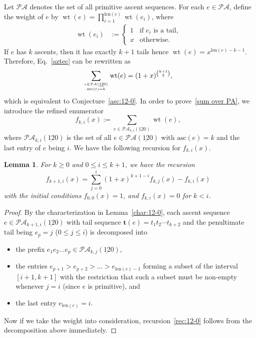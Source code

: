 \documentclass[12pt,A4]{amsart}
\numberwithin{equation}{section}
\theoremstyle{plain}
\newtheorem{lemma}[theorem]{Lemma}
\theoremstyle{definition}
\def\PA{\mathcal{PA}}
\def\len{\mathrm{len}}
\def\asc{\mathrm{asc}}
\def\wt{\operatorname{wt}}
\def\I{\operatorname{{\bf I}}}
\def\tt{\mathbf{t}}
\begin{document}
Let $\PA$ denotes the set of all primitive ascent sequences. For each $e\in\PA$, define the weight of $e$ by $\wt(e) =\prod\limits_{i=1}^{\len(e)}\wt(e_i)$, where 
\begin{align*}
\wt(e_i)&:=\begin{cases}
1 & \text{if $e_i$ is a tail,}\\
x & \text{otherwise.}
\end{cases}
\end{align*}
If $e$ has $k$ ascents, then it has exactly $k+1$ tails hence $\wt(e)=x^{\len(e)-k-1}$.
Therefore, Eq.~\eqref{aztec} can be rewritten as
\begin{equation}\label{sum over PA}
 \sum_{{e\in\PA(\underline{12}0)}\atop{\asc(e)=k}}\wt(e)=(1+x)^{{k+1\choose 2}},
\end{equation}
which is equivalent to Conjecture~\ref{asc:12-0}.
In order to prove~\eqref{sum over PA}, we introduce the refined enumerator 
$$
f_{k,i}(x):=\sum_{e\in\PA_{k,i}(\underline{12}0)}\wt(e), 
$$
where $\PA_{k,i}(\underline{12}0)$ is the set of all $e\in\PA(\underline{12}0)$ with $\asc(e)=k$ and the last entry of $e$ being $i$. We have the following recursion for $f_{k,i}(x)$.
\begin{lemma}For $k\geq0$ and $0\leq i\leq k+1$, we have the recursion
\begin{equation}\label{rec:12-0}
f_{k+1,i}(x)=\sum_{j=0}^{i}(1+x)^{k+1-i}f_{k,j}(x)-f_{k,i}(x)
\end{equation}
with the initial conditions $f_{0,0}(x)=1$, and $f_{k,i}(x)=0$ for $k<i$.
\end{lemma}

\begin{proof}
By the characterization in Lemma~\ref{char:12-0}, each ascent sequence $e\in\PA_{k+1,i}(\underline{12}0)$ with tail sequence $\tt(e)=t_1t_2\cdots t_{k+2}$ and the penultimate tail being $e_p=j$ ($0\le j\le i$) is  decomposed into
\begin{itemize}
\item the prefix $e_1e_2\ldots e_p\in\PA_{k,j}(\underline{12}0)$,
\item the entries $e_{p+1}>e_{p+2}>\ldots>e_{\len(e)-1}$ forming a subset of the interval $[i+1,k+1]$ with the restriction that such a subset must be non-empty whenever $j=i$ (since $e$ is primitive), and
\item the last entry $e_{\len(e)}=i$.
\end{itemize}
 Now if we take the weight into consideration, recursion~\eqref{rec:12-0} follows from the decomposition above immediately.
\end{proof}
\end{document}
